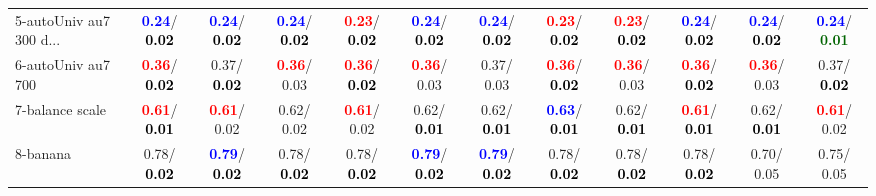 \begin{table}[h]
\begin{center}
{\begin{tabular}{lc|c|c|c|c|c|c|c|c|c|c}
5-autoUniv au7 300 d... & \textcolor{blue}{\textbf{  0.24}}/\textcolor{black}{\textbf{  0.02}} & \textcolor{blue}{\textbf{  0.24}}/\textcolor{black}{\textbf{  0.02}} & \textcolor{blue}{\textbf{  0.24}}/\textcolor{black}{\textbf{  0.02}} & \textcolor{red}{\textbf{  0.23}}/\textcolor{black}{\textbf{  0.02}} & \textcolor{blue}{\textbf{  0.24}}/\textcolor{black}{\textbf{  0.02}} & \textcolor{blue}{\textbf{  0.24}}/\textcolor{black}{\textbf{  0.02}} & \textcolor{red}{\textbf{  0.23}}/\textcolor{black}{\textbf{  0.02}} & \textcolor{red}{\textbf{  0.23}}/\textcolor{black}{\textbf{  0.02}} & \textcolor{blue}{\textbf{  0.24}}/\textcolor{black}{\textbf{  0.02}} & \textcolor{blue}{\textbf{  0.24}}/\textcolor{black}{\textbf{  0.02}} & \textcolor{blue}{\textbf{  0.24}}/\textcolor{darkgreen}{\textbf{  0.01}} \\
6-autoUniv au7 700 & \textcolor{red}{\textbf{  0.36}}/\textcolor{black}{\textbf{  0.02}} &   0.37/\textcolor{black}{\textbf{  0.02}} & \textcolor{red}{\textbf{  0.36}}/  0.03 & \textcolor{red}{\textbf{  0.36}}/\textcolor{black}{\textbf{  0.02}} & \textcolor{red}{\textbf{  0.36}}/  0.03 &   0.37/  0.03 & \textcolor{red}{\textbf{  0.36}}/\textcolor{black}{\textbf{  0.02}} & \textcolor{red}{\textbf{  0.36}}/  0.03 & \textcolor{red}{\textbf{  0.36}}/\textcolor{black}{\textbf{  0.02}} & \textcolor{red}{\textbf{  0.36}}/  0.03 &   0.37/\textcolor{black}{\textbf{  0.02}} \\
7-balance scale & \textcolor{red}{\textbf{  0.61}}/\textcolor{black}{\textbf{  0.01}} & \textcolor{red}{\textbf{  0.61}}/  0.02 &   0.62/  0.02 & \textcolor{red}{\textbf{  0.61}}/  0.02 &   0.62/\textcolor{black}{\textbf{  0.01}} &   0.62/\textcolor{black}{\textbf{  0.01}} & \textcolor{blue}{\textbf{  0.63}}/\textcolor{black}{\textbf{  0.01}} &   0.62/\textcolor{black}{\textbf{  0.01}} & \textcolor{red}{\textbf{  0.61}}/\textcolor{black}{\textbf{  0.01}} &   0.62/\textcolor{black}{\textbf{  0.01}} & \textcolor{red}{\textbf{  0.61}}/  0.02 \\ \hline
8-banana &   0.78/\textcolor{black}{\textbf{  0.02}} & \textcolor{blue}{\textbf{  0.79}}/\textcolor{black}{\textbf{  0.02}} &   0.78/\textcolor{black}{\textbf{  0.02}} &   0.78/\textcolor{black}{\textbf{  0.02}} & \textcolor{blue}{\textbf{  0.79}}/\textcolor{black}{\textbf{  0.02}} & \textcolor{blue}{\textbf{  0.79}}/\textcolor{black}{\textbf{  0.02}} &   0.78/\textcolor{black}{\textbf{  0.02}} &   0.78/\textcolor{black}{\textbf{  0.02}} &   0.78/\textcolor{black}{\textbf{  0.02}} &   0.70/  0.05 &   0.75/  0.05 \\

\end{tabular}}
\end{center}
\end{table}
